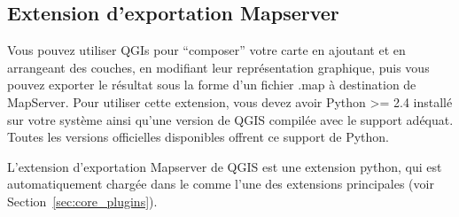 
%
%

\subsection{Extension d'exportation Mapserver}\label{sec:mapserver_export}

Vous pouvez utiliser QGIs pour ``composer'' votre carte en ajoutant et en arrangeant des couches, en modifiant leur représentation graphique, puis vous pouvez exporter le résultat sous la forme d'un fichier .map à destination de MapServer. Pour utiliser cette extension, vous devez avoir Python >= 2.4 installé sur votre système ainsi qu'une version de QGIS compilée avec le support adéquat. Toutes les versions officielles disponibles offrent ce support de Python.

L'extension d'exportation Mapserver de QGIS \CURRENT est une extension python, qui est automatiquement chargée dans le  comme l'une des extensions principales (voir Section~\ref{sec:core_plugins}).

%

